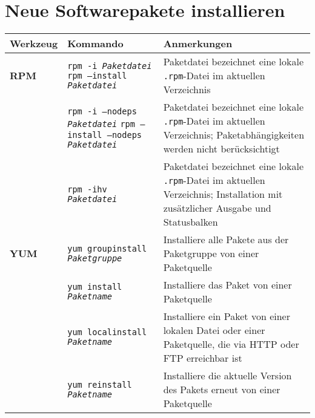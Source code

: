 \documentclass[10pt,a4paper]{article}
\begin{document}
\cheatsheet

\section{Neue Softwarepakete installieren}
\begin{tabular}{ p{3.5cm} p{9cm} p{11cm}}
  \hline
  \rowcolor{Gray}
  \textbf{Werkzeug} & \textbf{Kommando} & \textbf{Anmerkungen} \\
  \hline 
  \textbf{RPM} & \texttt{rpm -i \textit{Paketdatei}} \newline \texttt{rpm --install \textit{Paketdatei}} & Paketdatei bezeichnet eine lokale \texttt{.rpm}-Datei im aktuellen Verzeichnis\\
  \rowcolor{Gray}
  & \texttt{rpm -i --nodeps \textit{Paketdatei}} \newline \texttt{rpm --install --nodeps \textit{Paketdatei}} & Paketdatei bezeichnet eine lokale \texttt{.rpm}-Datei im aktuellen Verzeichnis; Paketabhängigkeiten werden nicht berücksichtigt\\
  & \texttt{rpm -ihv \textit{Paketdatei}} & Paketdatei bezeichnet eine lokale \texttt{.rpm}-Datei im aktuellen Verzeichnis; Installation mit zusätzlicher Ausgabe und Statusbalken\\
  \rowcolor{Gray}
  \textbf{YUM} & \texttt{yum groupinstall \textit{Paketgruppe}} & Installiere alle Pakete aus der Paketgruppe von einer Paketquelle\\
  & \texttt{yum install \textit{Paketname}} & Installiere das Paket von einer Paketquelle\\
  \rowcolor{Gray}
  & \texttt{yum localinstall \textit{Paketname}} & Installiere ein Paket von einer lokalen Datei oder einer Paketquelle, die via HTTP oder FTP erreichbar ist\\
  & \texttt{yum reinstall \textit{Paketname}} & Installiere die aktuelle Version des Pakets erneut von einer Paket\-quelle\\
  \hline
\end{tabular}
\end{document}
